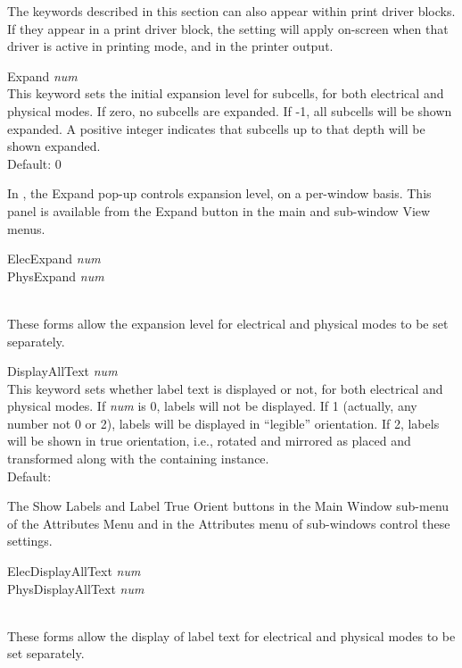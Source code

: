 The keywords described in this section can also appear within
print driver blocks.  If they appear in a print driver block, the
setting will apply on-screen when that driver is active in printing
mode, and in the printer output.

\begin{description}
\item{\vt Expand} {\it num}\\
This keyword sets the initial expansion level for subcells, for both
electrical and physical modes.  If zero, no subcells are expanded.  If
-1, all subcells will be shown expanded.  A positive integer indicates
that subcells up to that depth will be shown expanded.\\
Default: 0

In {\Xic}, the {\cb Expand} pop-up controls expansion level, on a
per-window basis.  This panel is available from the {\cb Expand}
button in the main and sub-window {\cb View} menus.

\item\parbox[b]{4in}{\vt
ElecExpand {\it num}\\
PhysExpand {\it num}}\\
These forms allow the expansion level for electrical and physical
modes to be set separately.

\item{\vt DisplayAllText} {\it num}\\
This keyword sets whether label text is displayed or not, for both
electrical and physical modes.  If {\it num} is 0, labels will not be
displayed.  If 1 (actually, any number not 0 or 2), labels will be
displayed in ``legible'' orientation.  If 2, labels will be shown in
true orientation, i.e., rotated and mirrored as placed and transformed
along with the containing instance.\\
Default: {}

The {\cb Show Labels} and {\cb Label True Orient} buttons in the {\cb
Main Window} sub-menu of the {\cb Attributes Menu} and in the {\cb
Attributes} menu of sub-windows control these settings.

\item\parbox[b]{4in}{\vt
ElecDisplayAllText {\it num}\\
PhysDisplayAllText {\it num}}\\
These forms allow the display of label text for electrical and
physical modes to be set separately.


\end{description}
